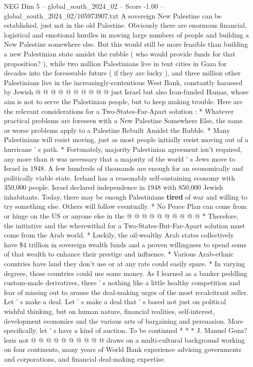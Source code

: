 \begin{textsample}{NEG Dim 5 – global\_south\_2024\_02 – Score -1.00 – global\_south\_2024\_02/105973907.txt}
A sovereign New Palestine can be established, just not in the old Palestine.
Obviously there are enormous financial, logistical and emotional hurdles in moving large numbers of people and building a New Palestine somewhere else.
But this would still be more feasible than building a new Palestinian state amidst the rubble ( who would provide funds for that proposition? ), while two million Palestinians live in tent cities in Gaza for decades into the foreseeable future ( if they are lucky ), and three million other Palestinians live in the increasingly-contentious West Bank, constantly harassed by Jewish @ @ @ @ @ @ @ @ @ @ just Israel but also Iran-funded Hamas, whose aim is not to serve the Palestinian people, but to keep making trouble.
Here are the relevant considerations for a Two-States-Far-Apart solution : * Whatever practical problems are foreseen with a New Palestine Somewhere Else, the same or worse problems apply to a Palestine Rebuilt Amidst the Rubble. * Many Palestinians will resist moving, just as most people initially resist moving out of a hurricane ' s path. * Fortunately, majority Palestinian agreement isn't required, any more than it was necessary that a majority of the world ' s Jews move to Israel in 1948.
A few hundreds of thousands are enough for an economically and politically viable state.
Iceland has a reasonably self-sustaining economy with 350,000 people.
Israel declared independence in 1948 with 850,000 Jewish inhabitants.
Today, there may be enough Palestinians \textbf{tired} of war and willing to try something else.
Others will follow eventually. * No Peace Plan can come from or hinge on the US or anyone else in the @ @ @ @ @ @ @ @ @ @ * Therefore, the initiative and the wherewithal for a Two-States-But-Far-Apart solution must come from the Arab world. * Luckily, the oil-wealthy Arab states collectively have \$4 trillion in sovereign wealth funds and a proven willingness to spend some of that wealth to enhance their prestige and influence. * Various Arab-ethnic countries have land they don't use or at any rate could easily spare. * In varying degrees, those countries could use some money.
As I learned as a banker peddling custom-made derivatives, there ' s nothing like a little healthy competition and fear of missing out to arouse the deal-making urges of the most recalcitrant seller.
Let ' s make a deal.
Let ' s make a deal that ' s based not just on political wishful thinking, but on human nature, financial realities, self-interest, development economics and the various arts of bargaining and persuasion.
More specifically, let ' s have a kind of auction.
To be continued * * * J.
Manuel Gonz? lezis not @ @ @ @ @ @ @ @ @ @ draws on a multi-cultural background working on four continents, many years of World Bank experience advising governments and corporations, and financial deal-making expertise.

\end{textsample}
